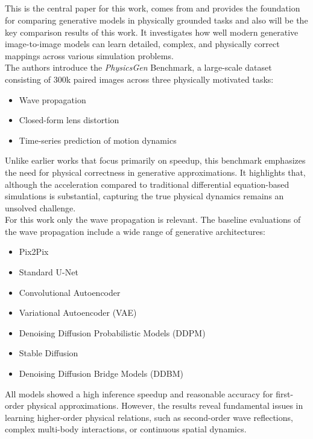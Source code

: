 		\subsection{}
			This is the central paper for this work, comes from \citeauthor{martin_spitznagel_physicsgen_2025} and provides the foundation for comparing generative models in physically grounded tasks and also will be the key comparison results of this work. It investigates how well modern generative image-to-image models can learn detailed, complex, and physically correct mappings across various simulation problems.\\
			The authors introduce the \textit{PhysicsGen} Benchmark, a large-scale dataset consisting of 300k paired images across three physically motivated tasks:
			\begin{itemize}[itemsep=1mm, parsep=0pt]
				\item Wave propagation
				\item Closed-form lens distortion
				\item Time-series prediction of motion dynamics
			\end{itemize}
			Unlike earlier works that focus primarily on speedup, this benchmark emphasizes the need for physical correctness in generative approximations. It highlights that, although the acceleration compared to traditional differential equation-based simulations is substantial, capturing the true physical dynamics remains an unsolved challenge.\\
			For this work only the wave propagation is relevant. The baseline evaluations of the wave propagation include a wide range of generative architectures:
			\begin{itemize}[itemsep=1mm, parsep=0pt]
				\item Pix2Pix
				\item Standard U-Net
				\item Convolutional Autoencoder
				\item Variational Autoencoder (VAE)
				\item Denoising Diffusion Probabilistic Models (DDPM)
				\item Stable Diffusion
				\item Denoising Diffusion Bridge Models (DDBM)
			\end{itemize}
			All models showed a high inference speedup and reasonable accuracy for first-order physical approximations. However, the results reveal fundamental issues in learning higher-order physical relations, such as second-order wave reflections, complex multi-body interactions, or continuous spatial dynamics.\\
